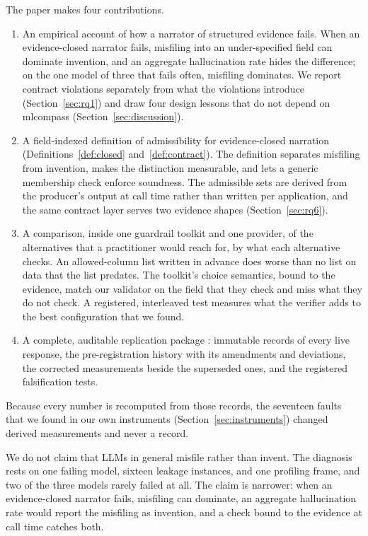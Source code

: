 \documentclass[smallextended,natbib]{svjour3}
\begin{document}
The paper makes four contributions.
\begin{enumerate}
\item An empirical account of how a narrator of structured evidence fails.
When an evidence-closed narrator fails, misfiling into an under-specified
field can dominate invention, and an aggregate hallucination rate hides the
difference; on the one model of three that fails often, misfiling dominates.
We report contract violations separately from what the violations introduce
(Section~\ref{sec:rq1}) and draw four design lessons that do not depend on
mlcompass (Section~\ref{sec:discussion}).
\item A field-indexed definition of admissibility for evidence-closed narration
(Definitions~\ref{def:closed} and~\ref{def:contract}). The definition
separates misfiling from invention, makes the distinction measurable, and lets
a generic membership check enforce soundness. The admissible sets are derived
from the producer's output at call time rather than written per application,
and the same contract layer serves two evidence shapes
(Section~\ref{sec:rq6}).
\item A comparison, inside one guardrail toolkit and one provider, of the
alternatives that a practitioner would reach for, by what each alternative
checks. An allowed-column list written in advance does worse than no list on
data that the list predates. The toolkit's choice semantics, bound to the
evidence, match our validator on the field that they check and miss what they
do not check. A registered, interleaved test measures what the verifier adds
to the best configuration that we found.
\item A complete, auditable replication package \citep{replication}:
immutable records of every live response, the pre-registration history with its
amendments and deviations, the corrected measurements beside the superseded
ones, and the registered falsification tests.
\end{enumerate}

Because every number is recomputed from those records, the seventeen faults
that we found in our own instruments (Section~\ref{sec:instruments}) changed
derived measurements and never a record.

We do not claim that LLMs in general misfile rather than invent. The
diagnosis rests on one failing model, sixteen leakage instances, and one
profiling frame, and two of the three models rarely failed at all. The claim
is narrower: when an evidence-closed narrator fails, misfiling can dominate,
an aggregate hallucination rate would report the misfiling as invention, and a
check bound to the evidence at call time catches both.
\end{document}

